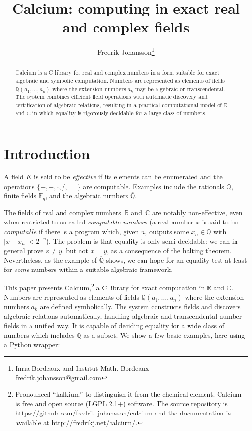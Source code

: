 \documentclass[11pt,a4paper]{article}
\title{Calcium: computing in exact real and complex fields}
\date{}
\author{Fredrik Johansson\footnote{Inria Bordeaux and Institut Math. Bordeaux -- \url{fredrik.johansson@gmail.com}}}
\begin{document}
\maketitle

\begin{abstract}
Calcium is a C library for real and complex numbers
in a form suitable for exact algebraic and symbolic computation.
Numbers are represented as elements of
fields $\mathbb{Q}(a_1,\ldots,a_n)$ where
the extension numbers
$a_k$ may be algebraic or transcendental.
The system combines efficient field operations
with automatic discovery and certification of algebraic relations,
resulting in a practical computational model of $\mathbb{R}$ and $\mathbb{C}$
in which equality is rigorously decidable for a large class of numbers.
\end{abstract}

\section{Introduction}

A field $K$ is said to be \emph{effective}
if its elements can be enumerated
and the operations $\{+, -, \cdot, /, =\}$
are computable.
Examples include the rationals $\mathbb{Q}$, finite fields $\mathbb{F}_q$,
and the algebraic numbers $\overline{\mathbb{Q}}$.

The fields of real and complex numbers~$\mathbb{R}$ and~$\mathbb{C}$
are notably non-effective, even 
when restricted to so-called \emph{computable numbers}
(a real number $x$ is said to be \emph{computable} if
there is a program
which, given $n$, outputs some $x_n \in \mathbb{Q}$ with $|x - x_n| < 2^{-n}$).
The problem is that equality is only semi-decidable: we can in general prove $x \ne y$,
but not $x = y$, as a consequence of the halting theorem.
Nevertheless,
as the example of $\overline{\mathbb{Q}}$ shows,
we can hope for an equality test at least for \emph{some} numbers
within a suitable algebraic framework.

This paper presents Calcium,\footnote{Pronounced ``kalkium'' to distinguish it from
the chemical element. Calcium is free and open source
(LGPL 2.1+) software. The source repository is
\url{https://github.com/fredrik-johansson/calcium} and
the documentation is available at \url{http://fredrikj.net/calcium/}.} a C library
for exact computation in $\mathbb{R}$ and $\mathbb{C}$.
Numbers are represented as elements of fields
$\mathbb{Q}(a_1,\ldots,a_n)$ where the extension numbers $a_k$
are defined symbolically.
The system constructs fields and discovers algebraic relations
automatically,
handling algebraic and transcendental number fields in a unified way.
It is capable of deciding equality
for a wide class of numbers
which includes $\overline{\mathbb{Q}}$ as a subset.
We show a few basic examples, here using a Python wrapper:
\end{document}
